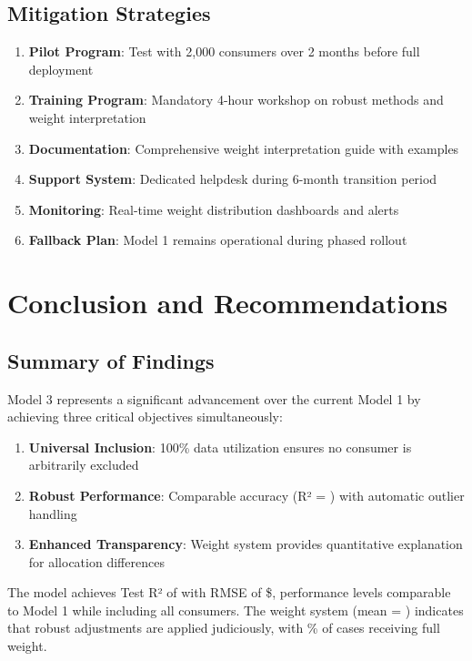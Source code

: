 \subsection{Mitigation Strategies}

\begin{enumerate}
    \item \textbf{Pilot Program}: Test with 2,000 consumers over 2 months before full deployment
    \item \textbf{Training Program}: Mandatory 4-hour workshop on robust methods and weight interpretation
    \item \textbf{Documentation}: Comprehensive weight interpretation guide with examples
    \item \textbf{Support System}: Dedicated helpdesk during 6-month transition period
    \item \textbf{Monitoring}: Real-time weight distribution dashboards and alerts
    \item \textbf{Fallback Plan}: Model 1 remains operational during phased rollout
\end{enumerate}

\section{Conclusion and Recommendations}

\subsection{Summary of Findings}

Model 3 represents a significant advancement over the current Model 1 by achieving three critical objectives simultaneously:

\begin{enumerate}
    \item \textbf{Universal Inclusion}: 100\% data utilization ensures no consumer is arbitrarily excluded
    \item \textbf{Robust Performance}: Comparable accuracy (R² = \ModelThreeRSquaredTest{}) with automatic outlier handling
    \item \textbf{Enhanced Transparency}: Weight system provides quantitative explanation for allocation differences
\end{enumerate}

The model achieves Test R² of \ModelThreeRSquaredTest{} with RMSE of \$\ModelThreeRMSETest{}, performance levels comparable to Model 1 while including all consumers. The weight system (mean = \ModelThreeMeanWeight{}) indicates that robust adjustments are applied judiciously, with \ModelThreeFullWeightPct{}\% of cases receiving full weight.


